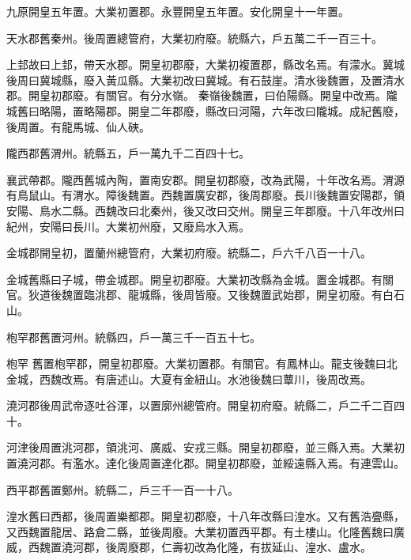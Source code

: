 \begin{pinyinscope}
 九原開皇五年置。大業初置郡。永豐開皇五年置。安化開皇十一年置。



 天水郡舊秦州。後周置總管府，大業初府廢。統縣六，戶五萬二千一百三十。



 上邽故曰上邽，帶天水郡。開皇初郡廢，大業初複置郡，縣改名焉。有濛水。冀城後周曰冀城縣，廢入黃瓜縣。大業初改曰冀城。有石鼓崖。清水後魏置，及置清水郡。開皇初郡廢。有關官。有分水嶺。
 秦嶺後魏置，曰伯陽縣。開皇中改焉。隴城舊曰略陽，置略陽郡。開皇二年郡廢，縣改曰河陽，六年改曰隴城。成紀舊廢，後周置。有龍馬城、仙人硤。



 隴西郡舊渭州。統縣五，戶一萬九千二百四十七。



 襄武帶郡。隴西舊城內陶，置南安郡。開皇初郡廢，改為武陽，十年改名焉。渭源有鳥鼠山。有渭水。障後魏置。西魏置廣安郡，後周郡廢。長川後魏置安陽郡，領安陽、鳥水二縣。西魏改曰北秦州，後又改曰交州。開皇三年郡廢。十八年改州曰紀州，安陽曰長川。大業初州廢，又廢烏水入焉。



 金城郡開皇初，置蘭州總管府，大業初府廢。統縣二，戶六千八百一十八。



 金城舊縣曰子城，帶金城郡。開皇初郡廢。大業初改縣為金城。置金城郡。有關官。狄道後魏置臨洮郡、龍城縣，後周皆廢。又後魏置武始郡，開皇初廢。有白石山。



 枹罕郡舊置河州。統縣四，戶一萬三千一百五十七。



 枹罕
 舊置枹罕郡，開皇初郡廢。大業初置郡。有關官。有鳳林山。龍支後魏曰北金城，西魏改焉。有唐述山。大夏有金紐山。水池後魏曰蕈川，後周改焉。



 澆河郡後周武帝逐吐谷渾，以置廓州總管府。開皇初府廢。統縣二，戶二千二百四十。



 河津後周置洮河郡，領洮河、廣威、安戎三縣。開皇初郡廢，並三縣入焉。大業初置澆河郡。有濫水。達化後周置達化郡。開皇初郡廢，並綏遠縣入焉。有連雲山。



 西平郡舊置鄭州。統縣二，戶三千一百一十八。



 湟水舊曰西都，後周置樂都郡。開皇初郡廢，十八年改縣曰湟水。又有舊浩亹縣，又西魏置龍居、路倉二縣，並後周廢。大業初置西平郡。有土樓山。化隆舊魏曰廣威，西魏置澆河郡，後周廢郡，仁壽初改為化隆，有拔延山、湟水、盧水。




\end{pinyinscope}

